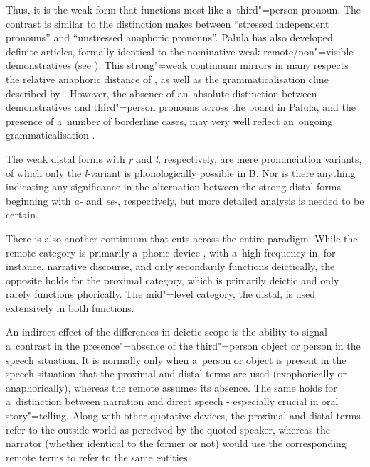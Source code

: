 Thus, it is the weak form that functions most like a~third"=person pronoun. The contrast is similar to the distinction \citet[417--419]{givon2001a} makes between ``stressed independent pronouns'' and ``unstressed anaphoric pronouns''. Palula has also developed definite articles, formally identical to the nominative weak remote/non"=visible demonstratives (see ). This strong"=weak continuum mirrors in many respects the relative anaphoric distance of \citet[419]{givon2001a}, as well as the grammaticalisation cline described by \citet[432]{diessel2006}. However, the absence of an~absolute distinction between demonstratives and third"=person pronouns across the board in Palula, and the presence of a~number of borderline cases, may very well reflect an~ongoing grammaticalisation \citep[213]{himmelmann1996}.


The weak distal forms with \textit{ṛ} and \textit{l}, respectively, are mere pronunciation variants, of which only the \textit{l}-variant is phonologically possible in B. Nor is there anything indicating any significance in the alternation between the strong distal forms beginning with \textit{a-} and \textit{ee-}, respectively, but more detailed analysis is needed to be certain.



There is also another continuum that cuts across the entire paradigm. While the remote category is primarily a~phoric device \citep[131]{saxena2006}, with a~high frequency in, for instance, narrative discourse, and only secondarily functions deictically, the opposite holds for the proximal category, which is primarily deictic and only rarely functions phorically. The mid"=level category, the distal, is used extensively in both functions. 



An indirect effect of the differences in deictic scope is the ability to signal a~contrast in the presence"=absence of the third"=person object or person in the speech situation. It is normally only when a~person or object is present in the speech situation that the proximal and distal terms are used (exophorically or anaphorically), whereas the remote assumes its absence. The same holds for a~distinction between narration and direct speech - especially crucial in oral story"=telling. Along with other quotative devices, the proximal and distal terms refer to the outside world as perceived by the quoted speaker, whereas the narrator (whether identical to the former or not) would use the corresponding remote terms to refer to the same entities.



